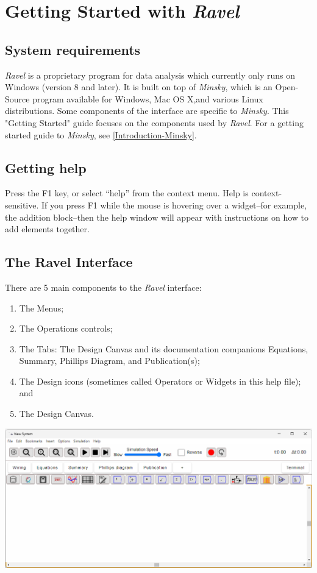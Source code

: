 
\chapter{Getting Started with \emph{Ravel}}

\section{System requirements}

\emph{Ravel} is a proprietary program for data analysis which currently
only runs on Windows (version 8 and later). It is built on top of
\emph{Minsky}, which is an Open-Source program available for Windows,
Mac OS X,and various Linux distributions. Some components of the interface
are specific to \emph{Minsky}. This "Getting Started" guide focuses
on the components used by \emph{Ravel}. For a getting started guide
to \emph{Minsky}, see \ref{Introduction-Minsky}.

\section{Getting help}

Press the F1 key, or select ``help'' from the context menu. Help
is context-sensitive. If you press F1 while the mouse is hovering
over a widget--for example, the addition block--then the help window
will appear with instructions on how to add elements together.

\section{The Ravel Interface}

There are 5 main components to the \emph{Ravel} interface:
\begin{enumerate}
\item The Menus;
\item The Operations controls;
\item The Tabs: The Design Canvas and its documentation companions Equations,
Summary, Phillips Diagram, and Publication(s);
\item The Design icons (sometimes called Operators or Widgets in this help
file); and
\item The Design Canvas.
\end{enumerate}
\includegraphics[width=15cm]{images/Interface}

